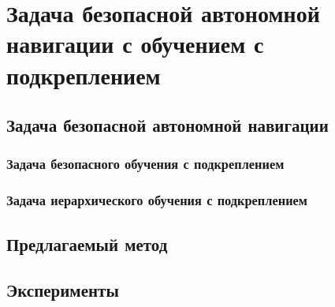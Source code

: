 \chapter{Задача безопасной автономной навигации с обучением с подкреплением}\label{ch:ch4}

\section{Задача безопасной автономной навигации}\label{sec:ch4/sec1}

\subsection{Задача безопасного обучения с подкреплением}

\subsection{Задача иерархического обучения с подкреплением}

\section{Предлагаемый метод}\label{sec:ch4/sec2}

\section{Эксперименты}\label{sec:ch4/sec3}